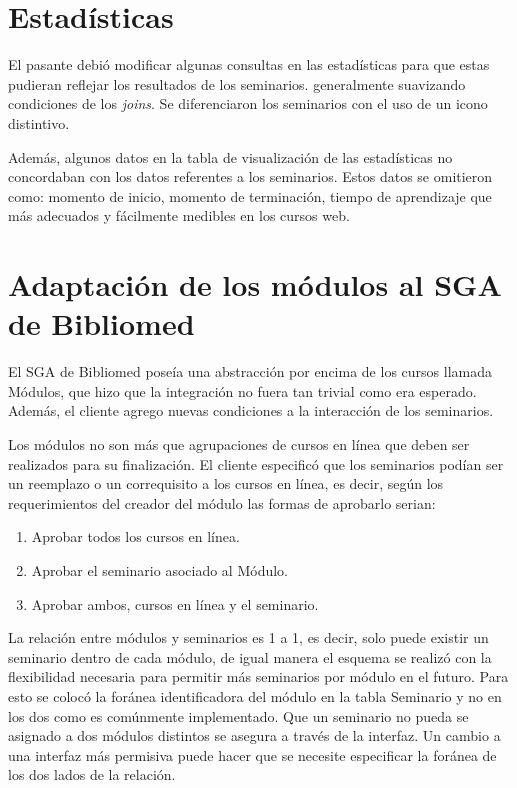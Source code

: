 	\section{Estadísticas} %
	\label{sec:estadisticas}
	
	El pasante debió modificar algunas consultas en las estadísticas para que estas pudieran reflejar los resultados de los seminarios. generalmente suavizando condiciones de los \emph{joins}. Se diferenciaron los seminarios con el uso de un icono distintivo.

	Además, algunos datos en la tabla de visualización de las estadísticas no concordaban con los datos referentes a los seminarios. Estos datos se omitieron como: momento de inicio, momento de terminación, tiempo de aprendizaje que más adecuados y fácilmente medibles en los cursos web.

	\section{Adaptación de los módulos al SGA de Bibliomed} %
	\label{sec:adaptacion_de_los_modulos_al_sga_de_bibliomed}
	
	El SGA de Bibliomed poseía una abstracción por encima de los cursos llamada Módulos, que hizo que la integración no fuera tan trivial como era esperado. Además, el cliente agrego nuevas condiciones a la interacción de los seminarios.

	Los módulos no son más que agrupaciones de cursos en línea que deben ser realizados para su finalización. El cliente especificó que los seminarios podían ser un reemplazo o un correquisito a los cursos en línea, es decir, según los requerimientos del creador del módulo las formas de aprobarlo serian:

	\begin{enumerate}
		\item Aprobar todos los cursos en línea.
		\item Aprobar el seminario asociado al Módulo.
		\item Aprobar ambos, cursos en línea y el seminario.
	\end{enumerate}

	La relación entre módulos y seminarios es 1 a 1, es decir, solo puede existir un seminario dentro de cada módulo, de igual manera el esquema se realizó con la flexibilidad necesaria para permitir más seminarios por módulo en el futuro. Para esto se colocó la foránea identificadora del módulo en la tabla Seminario y no en los dos como es comúnmente implementado. Que un seminario no pueda se asignado a dos módulos distintos se asegura a través de la interfaz. Un cambio a una interfaz más permisiva puede hacer que se necesite especificar la foránea de los dos lados de la relación. 

